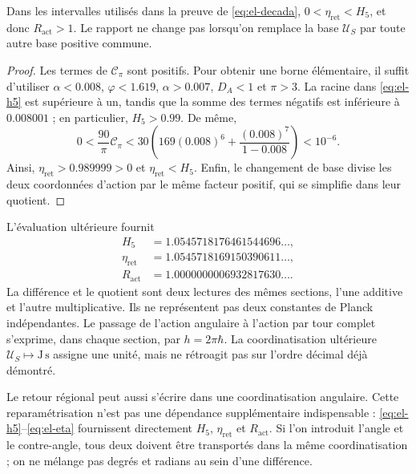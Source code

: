 \begin{proposition}
Dans les intervalles utilisés dans la preuve de \eqref{eq:el-decada},
\(0<\eta_{\mathrm{ret}}<H_5\), et donc
\(R_{\mathrm{act}}>1\). Le rapport ne change pas lorsqu'on remplace la base
\(\mathcal U_S\) par toute autre base positive commune.
\end{proposition}
\begin{proof}
Les termes de \(\mathcal C_\pi\) sont positifs. Pour obtenir une borne
élémentaire, il suffit d'utiliser \(\alpha<0.008\), \(\varphi<1.619\),
\(\alpha>0.007\), \(D_A<1\) et \(\pi>3\). La racine dans
\eqref{eq:el-h5} est supérieure à un, tandis que la somme des termes
négatifs est inférieure à \(0.008001\) ; en particulier, \(H_5>0.99\).
De même,
\[
 0<\frac{90}{\pi}\mathcal C_\pi
 <30\left(169(0.008)^6+
           \frac{(0.008)^7}{1-0.008}\right)<10^{-6}.
\]
Ainsi, \(\eta_{\mathrm{ret}}>0.989999>0\) et
\(\eta_{\mathrm{ret}}<H_5\). Enfin, le changement de base divise
les deux coordonnées d'action par le même facteur positif, qui se simplifie dans
leur quotient.
\end{proof}

L'évaluation ultérieure fournit
\begin{align*}
 H_5&=1.0545718176461544696\ldots,\\
 \eta_{\mathrm{ret}}&=1.0545718169150390611\ldots,\\
 R_{\mathrm{act}}&=1.0000000006932817630\ldots.
\end{align*}
La différence et le quotient sont deux lectures des mêmes sections,
l'une additive et l'autre multiplicative. Ils ne représentent pas deux constantes de
Planck indépendantes. Le passage de l'action angulaire à l'action par tour
complet s'exprime, dans chaque section, par
\(h=2\pi\hbar\). La coordinatisation ultérieure
\(\mathcal U_S\mapsto\mathrm{J\,s}\) assigne une unité, mais ne
rétroagit pas sur l'ordre décimal déjà démontré.

Le retour régional peut aussi s'écrire dans une coordinatisation angulaire.
Cette reparamétrisation n'est pas une dépendance supplémentaire indispensable :
\eqref{eq:el-h5}--\eqref{eq:el-eta} fournissent directement
\(H_5\), \(\eta_{\mathrm{ret}}\) et \(R_{\mathrm{act}}\). Si l'on
introduit l'angle et le contre-angle, tous deux doivent être transportés dans la même
coordinatisation ; on ne mélange pas degrés et radians au sein d'une différence.



